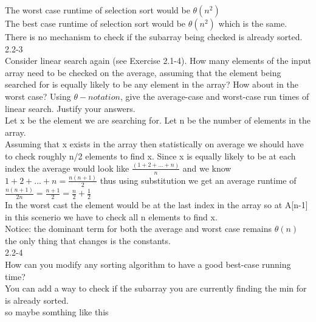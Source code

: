 The worst case runtime of selection sort would be $\theta(n^2)$ \\

The best case runtime of selection sort would be $\theta(n^2)$ which is the same. There is no mechanism to check if the subarray
being checked is already sorted.\\

2.2-3 \\
Consider linear search again (see Exercise 2.1-4). How many elements of the input 
array need to be checked on the average, assuming that the element being searched 
for is equally likely to be any element in the array? How about in the worst case? 
Using $\theta -notation$, give the average-case and worst-case run times of linear 
search. Justify your answers. \\

Let x be the element we are searching for. 
Let n be the number of elements in the array. \\

Assuming that x exists in the array then statistically on average we should have to 
check roughly n/2 elements to find x.  
Since x is equally likely to be at each index the average would look like $\frac{(1 + 2 + ... + n)}{n}$
and we know $1 + 2 + ... + n = \frac{n(n+1)}{2}$ thus using substitution we get an average runtime of
$\frac{n(n+1)}{2n} = \frac{n+1}{2} = \frac{n}{2} + \frac{1}{2}$\\

In the worst cast the element would be at 
the last index in the array so at A[n-1] in this scenerio we have to check all n elements to find x. \\

Notice: the dominant term for both the average and worst case remains $\theta(n)$ the only thing that changes
is the constants. \\

2.2-4 \\
How can you modify any sorting algorithm to have a good best-case running time? \\
You can add a way to check if the subarray you are currently finding the min for is already sorted. \\ 
so maybe somthing like this \\

